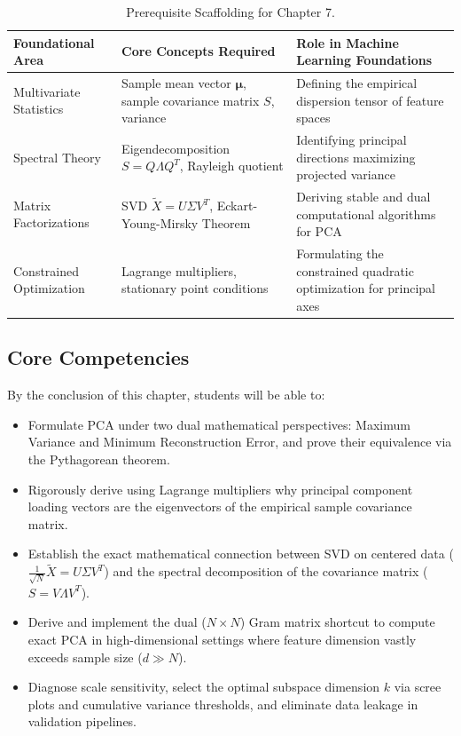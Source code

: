 \begin{table}[htbp]
\centering
\small
\begin{tabularx}{\textwidth}{lXX}
\toprule
\textbf{Foundational Area} & \textbf{Core Concepts Required} & \textbf{Role in Machine Learning Foundations} \\
\midrule
Multivariate Statistics & Sample mean vector $\boldsymbol{\mu}$, sample covariance matrix $S$, variance & Defining the empirical dispersion tensor of feature spaces \\
\addlinespace
Spectral Theory & Eigendecomposition $S = Q \Lambda Q^T$, Rayleigh quotient & Identifying principal directions maximizing projected variance \\
\addlinespace
Matrix Factorizations & SVD $\tilde{X} = U \Sigma V^T$, Eckart-Young-Mirsky Theorem & Deriving stable and dual computational algorithms for PCA \\
\addlinespace
Constrained Optimization & Lagrange multipliers, stationary point conditions & Formulating the constrained quadratic optimization for principal axes \\
\bottomrule
\end{tabularx}
\caption{Prerequisite Scaffolding for Chapter 7.}
\label{tab:w07_prereqs}
\end{table}

\subsection{Core Competencies}
By the conclusion of this chapter, students will be able to:
\begin{itemize}
    \item Formulate PCA under two dual mathematical perspectives: Maximum Variance and Minimum Reconstruction Error, and prove their equivalence via the Pythagorean theorem.
    \item Rigorously derive using Lagrange multipliers why principal component loading vectors are the eigenvectors of the empirical sample covariance matrix.
    \item Establish the exact mathematical connection between SVD on centered data ($\frac{1}{\sqrt{N}}\tilde{X} = U \Sigma V^T$) and the spectral decomposition of the covariance matrix ($S = V \Lambda V^T$).
    \item Derive and implement the dual ($N \times N$) Gram matrix shortcut to compute exact PCA in high-dimensional settings where feature dimension vastly exceeds sample size ($d \gg N$).
    \item Diagnose scale sensitivity, select the optimal subspace dimension $k$ via scree plots and cumulative variance thresholds, and eliminate data leakage in validation pipelines.
\end{itemize}

